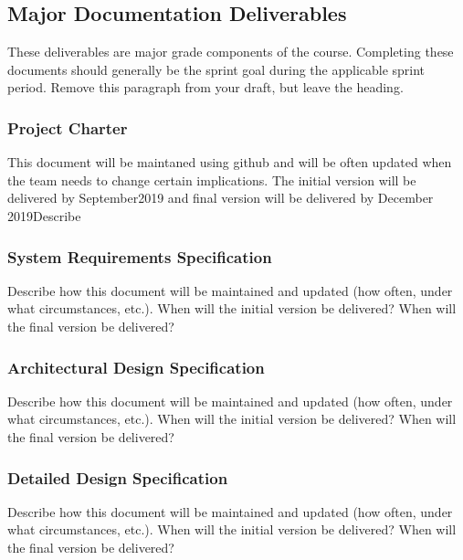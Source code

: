 
\subsection{Major Documentation Deliverables}
These deliverables are major grade components of the course. Completing these documents should generally be the sprint goal during the applicable sprint period. Remove this paragraph from your draft, but leave the heading.

\subsubsection{Project Charter}
This document will be maintaned using github and will be often updated when the team needs to change certain implications. The initial version will be delivered by September2019 and final version will be delivered by December 2019Describe 

\subsubsection{System Requirements Specification}
Describe how this document will be maintained and updated (how often, under what circumstances, etc.). When will the initial version be delivered? When will the final version be delivered?

\subsubsection{Architectural Design Specification}
Describe how this document will be maintained and updated (how often, under what circumstances, etc.). When will the initial version be delivered? When will the final version be delivered?

\subsubsection{Detailed Design Specification}
Describe how this document will be maintained and updated (how often, under what circumstances, etc.). When will the initial version be delivered? When will the final version be delivered?

